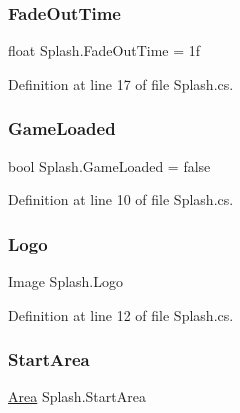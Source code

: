 \mbox{\label{class_splash_ab96945b1edacf1b809cc117cf5411d95}} 
\subsubsection{\texorpdfstring{Fade\+Out\+Time}{FadeOutTime}}
{\footnotesize\ttfamily float Splash.\+Fade\+Out\+Time = 1f}



Definition at line 17 of file Splash.\+cs.

\mbox{\label{class_splash_a9eafc84b9c0059feeeb4276473441d27}} 
\subsubsection{\texorpdfstring{Game\+Loaded}{GameLoaded}}
{\footnotesize\ttfamily bool Splash.\+Game\+Loaded = false\hspace{0.3cm}{\ttfamily [static]}}



Definition at line 10 of file Splash.\+cs.

\mbox{\label{class_splash_ab1b30c9ae1e8d9c32eceda9df2946687}} 
\subsubsection{\texorpdfstring{Logo}{Logo}}
{\footnotesize\ttfamily Image Splash.\+Logo}



Definition at line 12 of file Splash.\+cs.

\mbox{\label{class_splash_ac323127b3735b94bdc15f4c4e8c54659}} 
\subsubsection{\texorpdfstring{Start\+Area}{StartArea}}
{\footnotesize\ttfamily \mbox{\hyperlink{class_area}{Area}} Splash.\+Start\+Area}



